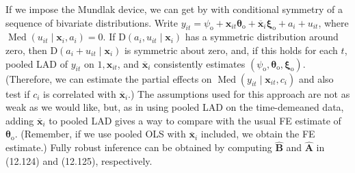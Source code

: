 \documentclass[10pt]{article}
\begin{document}
If we impose the Mundlak device, we can get by with conditional symmetry of a sequence of bivariate distributions. Write $y_{i t}=\psi_{\mathrm{o}}+\mathbf{x}_{i t} \boldsymbol{\theta}_{\mathrm{o}}+\overline{\mathbf{x}}_{i} \boldsymbol{\xi}_{\mathrm{o}}+a_{i}+u_{i t}$, where $\operatorname{Med}\left(u_{i t} \mid \mathbf{x}_{i}, a_{i}\right)=0$. If $\mathrm{D}\left(a_{i}, u_{i t} \mid \mathbf{x}_{i}\right)$ has a symmetric distribution around zero, then $\mathrm{D}\left(a_{i}+u_{i t} \mid \mathbf{x}_{i}\right)$ is symmetric about zero, and, if this holds for each $t$, pooled LAD of $y_{i t}$ on $1, \mathbf{x}_{i t}$, and $\overline{\mathbf{x}}_{i}$ consistently estimates $\left(\psi_{\mathrm{o}}, \boldsymbol{\theta}_{\mathrm{o}}, \boldsymbol{\xi}_{\mathrm{o}}\right)$. (Therefore, we can estimate the partial effects on $\operatorname{Med}\left(y_{i t} \mid \mathbf{x}_{i t}, c_{i}\right)$ and also test if $c_{i}$ is correlated with $\overline{\mathbf{x}}_{i}$.) The assumptions used for this approach are not as weak as we would like, but, as in using pooled LAD on the time-demeaned data, adding $\overline{\mathbf{x}}_{i}$ to pooled LAD gives a way to compare with the usual FE estimate of $\boldsymbol{\theta}_{\mathrm{o}}$. (Remember, if we use pooled OLS with $\overline{\mathbf{x}}_{i}$ included, we obtain the FE estimate.) Fully robust inference can be obtained by computing $\hat{\mathbf{B}}$ and $\hat{\mathbf{A}}$ in (12.124) and (12.125), respectively.
\end{document}
